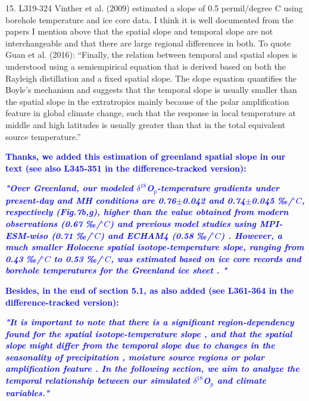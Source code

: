 \documentclass[gmd, manuscript]{copernicus}
\begin{document}
\medskip


15. L319-324 Vinther et al. (2009) estimated a slope of 0.5 permil/degree C using borehole temperature and ice core data. I think it is well documented from the papers I mention above that the spatial slope and temporal slope are not interchangeable and that there are large regional differences in both. To quote Guan et al. (2016): “Finally, the relation between temporal and spatial slopes is understood using a semiempirical equation that is derived based on both the Rayleigh distillation and a fixed spatial slope. The slope equation quantifies the Boyle's mechanism and suggests that the temporal slope is usually smaller than the spatial slope in the extratropics mainly because of the polar amplification feature in global climate change, such that the response in local temperature at middle and high latitudes is usually greater than that in the total equivalent source temperature.”

\medskip

\textcolor{blue}{\textbf{Thanks, we added this estimation of greenland spatial slope in our text (see also L345-351 in the difference-tracked version):}}

\textcolor{blue}{\textbf{\textit{"Over Greenland, our modeled  $\delta^{18}$O$_p$-temperature gradients under present-day and MH conditions are 0.76$\pm$0.042 and 0.74$\pm$0.045 ‰/$^{\circ}C$, respectively (Fig.7b,g), higher than the  value obtained from modern observations  (0.67 ‰/$^{\circ}C$) \citep{johnsen1989origin} and previous model studies using MPI-ESM-wiso (0.71 ‰/$^{\circ}C$) \citep{cauquoin2019water} and ECHAM4  (0.58 ‰/$^{\circ}C$)  \citep{werner2000borehole}.  However, a much smaller Holocene spatial isotope-temperature slope, ranging from 0.43 ‰/$^{\circ}C$ to 0.53 ‰/$^{\circ}C$, was estimated based on ice core records and borehole temperatures for the Greenland ice sheet  \citep{vinther2009holocene}. "}}}

\medskip

\textcolor{blue}{\textbf{Besides, in the end of section 5.1, as also added (see L361-364 in the difference-tracked version):}}

\textcolor{blue}{\textbf{\textit{"It is important to note that there is a significant region-dependency found for the spatial isotope-temperature slope \citep{sjolte2011modeling}, and that the spatial  slope might differ from the temporal slope due to changes in the seasonality of precipitation   \citep[e.g.,][]{werner2000borehole},  moisture source regions  \citep[e.g.,][]{delaygue2000origin} or  polar amplification feature \citep{guan2016understanding}. In the following section, we aim to analyze the temporal relationship between our simulated $\delta^{18}$O$_p$ and climate variables."}}}
\end{document}
